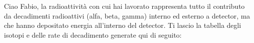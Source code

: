 




Ciao Fabio, la radioattività con cui hai lavorato rappresenta tutto il contributo da decadimenti radioattivi (alfa, beta, gamma) interno ed esterno a detector, ma che hanno depositato energia all'interno del detector.
Ti lascio la tabella degli isotopi e delle rate di decadimento generate qui di seguito:


